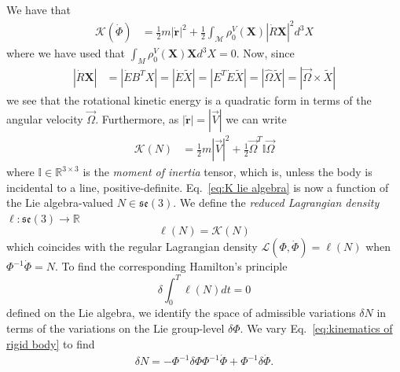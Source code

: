 We have that
\begin{equation} \label{eq:rigid body kinetic energy 2}
\begin{aligned}
\mathcal{K}(\dot{\Phi}) & = \frac{1}{2} m |\dot{\mathbf{r}}|^2 + \frac{1}{2} \int_\mathscr{M} \rho^V_0(\mathbf{X}) | \dot{R} \mathbf{X}|^2 d^3 X
\end{aligned}
\end{equation}
where we have used that $\int_M \rho^V_0(\mathbf{X}) \mathbf{X} d^3 X = 0$. Now, since
\begin{equation}
\begin{aligned}
|\dot{R} \mathbf{X}| & = |\dot{E} B^T X| = |\dot{E} \tilde{X}| = |E^T \dot{E} \tilde{X}|
= |\hat{\Omega} \tilde{X}| = |\vec{\Omega} \times \tilde{X}|
\end{aligned}
\end{equation}
we see that the rotational kinetic energy is a quadratic form in terms of the angular velocity $\vec{\Omega}$. Furthermore, as $|\dot{\mathbf{r}}| = |\vec{V}|$ we can write
\begin{equation} \label{eq:K lie algebra}
\begin{aligned}
\mathcal{K}(N) & = \frac{1}{2} m |\vec{V}|^2 + \frac{1}{2} \vec{\Omega}^T \mathbb{I} \vec{\Omega}
\end{aligned}
\end{equation}
where $\mathbb{I} \in \mathbb{R}^{3 \times 3}$ is the \textit{moment of inertia} tensor, which is, unless the body is incidental to a line, positive-definite. Eq.~\ref{eq:K lie algebra} is now a function of the Lie algebra-valued $N \in \mathfrak{se}(3)$. We define the \textit{reduced Lagrangian density} $\ell : \mathfrak{se}(3) \to \mathbb{R}$
\begin{equation}
\ell(N) = \mathcal{K}(N)
\end{equation}
which coincides with the regular Lagrangian density $\mathcal{L}(\Phi, \dot{\Phi}) = \ell(N)$ when $\Phi^{-1} \dot{\Phi} = N$. To find the corresponding Hamilton's principle
\begin{equation} \label{eq:lie algebra Hamiltons principle}
\delta \int_0^T \ell(N) dt = 0
\end{equation}
defined on the Lie algebra, we identify the space of admissible variations $\delta N$ in terms of the variations on the Lie group-level $\delta \Phi$. We vary Eq.~\ref{eq:kinematics of rigid body} to find
\begin{equation}
\begin{aligned}
\delta N = - \Phi^{-1} \delta \Phi \Phi^{-1} \dot{\Phi} + \Phi^{-1} \delta \dot{\Phi}.
\end{aligned}
\end{equation}

